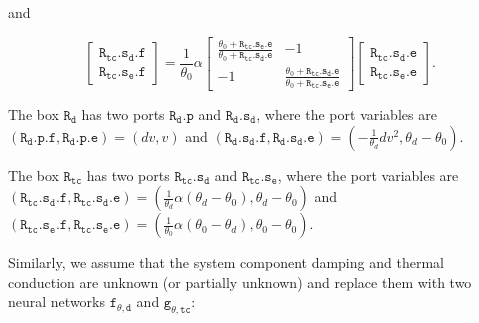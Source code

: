 \documentclass[
	parskip, 			   %
	twoside, 			   %
	DIV=14, 			   %
	BCOR=15.0mm, 		   %
	headsepline, 		   %
	open=right, 		   %
	captions=tableheading, %
	bibliography=totoc,    %
	numbers=noenddot       %
]{scrreprt}
\begin{document}
and

\begin{equation}
    \label{eq:resistive_structure_thermal_conduction_interconnection_ndho}
    \left[\begin{array}{l}\mathtt{R_{tc}.s_{d}.f} \\ \mathtt{R_{tc}.s_{e}.f}\end{array}\right]=\frac{1}{\theta_0} \alpha \left[\begin{array}{rr} \frac{\theta_0+\mathtt{R_{tc}.s_{e}.e}}{\theta_0+\mathtt{R_{tc}.s_{d}.e}} & -1 \\ -1 & \frac{\theta_0+\mathtt{R_{tc}.s_{d}.e}}{\theta_0+\mathtt{R_{tc}.s_{e}.e}}\end{array}\right]\left[\begin{array}{l}\mathtt{R_{tc}.s_{d}.e} \\ \mathtt{R_{tc}.s_{e}.e}\end{array}\right].
\end{equation}

The box $\mathtt{R_d}$ has two ports $\mathtt{R_{d}.p}$ and $\mathtt{R_{d}.s_{d}}$, where the port variables are $(\mathtt{R_{d}.p.f}, \mathtt{R_{d}.p.e}) = (dv, v)$ and $(\mathtt{R_{d}.s_{d}.f}, \mathtt{R_{d}.s_{d}.e}) = (-\frac{1}{\theta_d}dv^2, \theta_d - \theta_0)$.

The box $\mathtt{R_{tc}}$ has two ports $\mathtt{R_{tc}.s_{d}}$ and $\mathtt{R_{tc}.s_{e}}$, where the port variables are $(\mathtt{R_{tc}.s_{d}.f}, \mathtt{R_{tc}.s_{d}.e}) = (\frac{1}{\theta_d}\alpha(\theta_d-\theta_0), \theta_d-\theta_0)$ and $(\mathtt{R_{tc}.s_{e}.f}, \mathtt{R_{tc}.s_{e}.e}) = (\frac{1}{\theta_0}\alpha(\theta_0-\theta_d), \theta_0-\theta_0)$.

Similarly, we assume that the system component damping and thermal conduction are unknown (or partially unknown) and replace them with two neural networks $\mathtt{f_{\theta, d}}$ and $\mathtt{g_{\theta, tc}}$:
\end{document}
